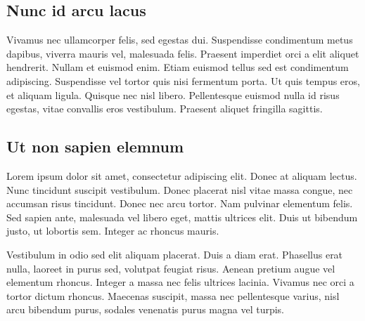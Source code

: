 \subsection{Nunc id arcu lacus}

Vivamus nec ullamcorper felis, sed egestas dui. Suspendisse condimentum metus dapibus, viverra mauris vel, malesuada felis. Praesent imperdiet orci a elit aliquet hendrerit. Nullam et euismod enim. Etiam euismod tellus sed est condimentum adipiscing. Suspendisse vel tortor quis nisi fermentum porta. Ut quis tempus eros, et aliquam ligula. Quisque nec nisl libero. Pellentesque euismod nulla id risus egestas, vitae convallis eros vestibulum. Praesent aliquet fringilla sagittis.

\subsection{Ut non sapien elemnum}

Lorem ipsum dolor sit amet, consectetur adipiscing elit. Donec at aliquam lectus. Nunc tincidunt suscipit vestibulum. Donec placerat nisl vitae massa congue, nec accumsan risus tincidunt. Donec nec arcu tortor. Nam pulvinar elementum felis. Sed sapien ante, malesuada vel libero eget, mattis ultrices elit. Duis ut bibendum justo, ut lobortis sem. Integer ac rhoncus mauris.

Vestibulum in odio sed elit aliquam placerat. Duis a diam erat. Phasellus erat nulla, laoreet in purus sed, volutpat feugiat risus. Aenean pretium augue vel elementum rhoncus. Integer a massa nec felis ultrices lacinia. Vivamus nec orci a tortor dictum rhoncus. Maecenas suscipit, massa nec pellentesque varius, nisl arcu bibendum purus, sodales venenatis purus magna vel turpis.